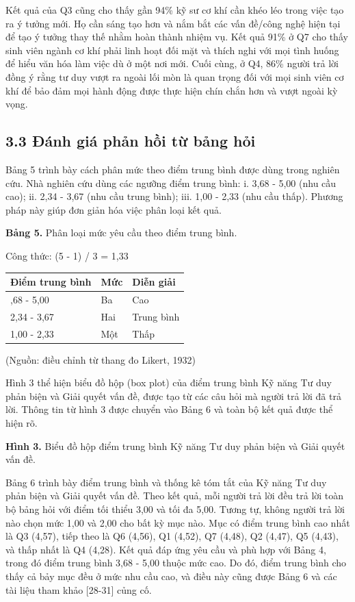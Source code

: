 Kết quả của Q3 cũng cho thấy gần 94\% kỹ sư cơ khí cần khéo léo trong việc tạo ra ý tưởng mới. Họ cần sáng tạo hơn và nắm bắt các vấn đề/công nghệ hiện tại để tạo ý tưởng thay thế nhằm hoàn thành nhiệm vụ. Kết quả 91\% ở Q7 cho thấy sinh viên ngành cơ khí phải linh hoạt đối mặt và thích nghi với mọi tình huống để hiểu văn hóa làm việc dù ở một nơi mới. Cuối cùng, ở Q4, 86\% người trả lời đồng ý rằng tư duy vượt ra ngoài lối mòn là quan trọng đối với mọi sinh viên cơ khí để bảo đảm mọi hành động được thực hiện chín chắn hơn và vượt ngoài kỳ vọng.

\subsection{3.3 Đánh giá phản hồi từ bảng hỏi}

Bảng 5 trình bày cách phân mức theo điểm trung bình được dùng trong nghiên cứu. Nhà nghiên cứu dùng các ngưỡng điểm trung bình: i. 3,68 - 5,00 (nhu cầu cao); ii. 2,34 - 3,67 (nhu cầu trung bình); iii. 1,00 - 2,33 (nhu cầu thấp). Phương pháp này giúp đơn giản hóa việc phân loại kết quả.

\textbf{Bảng 5.} Phân loại mức yêu cầu theo điểm trung bình.

Công thức: (5 - 1) / 3 = 1,33

{\small
\begin{longtable}[]{@{}lll@{}}
\toprule\noalign{}
Điểm trung bình & Mức & Diễn giải \\
\midrule\noalign{}
\endhead
\bottomrule\noalign{}
\endlastfoot
3,68 - 5,00 & Ba & Cao \\
2,34 - 3,67 & Hai & Trung bình \\
1,00 - 2,33 & Một & Thấp \\
\end{longtable}
}

(Nguồn: điều chỉnh từ thang đo Likert, 1932)

Hình 3 thể hiện biểu đồ hộp (box plot) của điểm trung bình Kỹ năng Tư duy phản biện và Giải quyết vấn đề, được tạo từ các câu hỏi mà người trả lời đã trả lời. Thông tin từ hình 3 được chuyển vào Bảng 6 và toàn bộ kết quả được thể hiện rõ.

\textbf{Hình 3.} Biểu đồ hộp điểm trung bình Kỹ năng Tư duy phản biện và Giải quyết vấn đề.

Bảng 6 trình bày điểm trung bình và thống kê tóm tắt của Kỹ năng Tư duy phản biện và Giải quyết vấn đề. Theo kết quả, mỗi người trả lời đều trả lời toàn bộ bảng hỏi với điểm tối thiểu 3,00 và tối đa 5,00. Tương tự, không người trả lời nào chọn mức 1,00 và 2,00 cho bất kỳ mục nào. Mục có điểm trung bình cao nhất là Q3 (4,57), tiếp theo là Q6 (4,56), Q1 (4,52), Q7 (4,48), Q2 (4,47), Q5 (4,43), và thấp nhất là Q4 (4,28). Kết quả đáp ứng yêu cầu và phù hợp với Bảng 4, trong đó điểm trung bình 3,68 - 5,00 thuộc mức cao. Do đó, điểm trung bình cho thấy cả bảy mục đều ở mức nhu cầu cao, và điều này cũng được Bảng 6 và các tài liệu tham khảo {[}28-31{]} củng cố.

